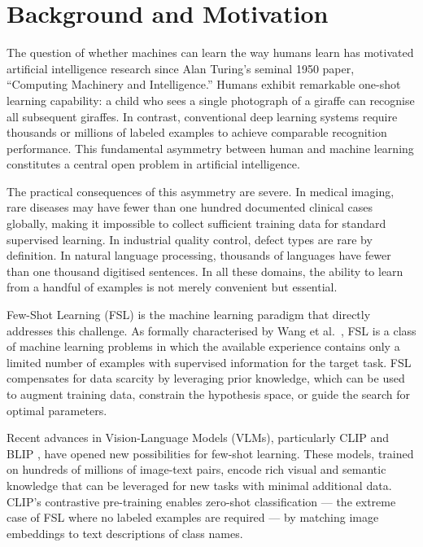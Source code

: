 \documentclass{iutbscthesis}
\begin{document}
\section{Background and Motivation}

The question of whether machines can learn the way humans learn has motivated artificial intelligence research since Alan Turing's seminal 1950 paper, ``Computing Machinery and Intelligence.'' Humans exhibit remarkable one-shot learning capability: a child who sees a single photograph of a giraffe can recognise all subsequent giraffes. In contrast, conventional deep learning systems require thousands or millions of labeled examples to achieve comparable recognition performance. This fundamental asymmetry between human and machine learning constitutes a central open problem in artificial intelligence.

The practical consequences of this asymmetry are severe. In medical imaging, rare diseases may have fewer than one hundred documented clinical cases globally, making it impossible to collect sufficient training data for standard supervised learning. In industrial quality control, defect types are rare by definition. In natural language processing, thousands of languages have fewer than one thousand digitised sentences. In all these domains, the ability to learn from a handful of examples is not merely convenient but essential.

Few-Shot Learning (FSL) is the machine learning paradigm that directly addresses this challenge. As formally characterised by Wang et al.\ \cite{wang2020fslsurvey}, FSL is a class of machine learning problems in which the available experience contains only a limited number of examples with supervised information for the target task. FSL compensates for data scarcity by leveraging prior knowledge, which can be used to augment training data, constrain the hypothesis space, or guide the search for optimal parameters.

Recent advances in Vision-Language Models (VLMs), particularly CLIP \cite{radford2021clip} and BLIP \cite{li2022blip}, have opened new possibilities for few-shot learning. These models, trained on hundreds of millions of image-text pairs, encode rich visual and semantic knowledge that can be leveraged for new tasks with minimal additional data. CLIP's contrastive pre-training enables zero-shot classification --- the extreme case of FSL where no labeled examples are required --- by matching image embeddings to text descriptions of class names.
\end{document}
